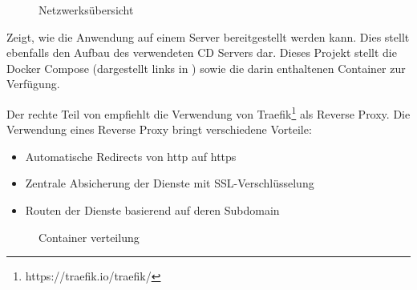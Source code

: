 \begin{figure}[h]
    \centering
    
    \caption{Netzwerksübersicht}\label{fig:Netzwerksuebersicht}
\end{figure}

\newpage
{} Zeigt, wie die Anwendung auf einem Server bereitgestellt werden kann.
Dies stellt ebenfalls den Aufbau des verwendeten \ac{CD} Servers dar.
Dieses Projekt stellt die Docker Compose (dargestellt links in )
sowie die darin enthaltenen Container zur Verfügung.

Der rechte Teil von  empfiehlt die Verwendung von Traefik\footnote{https://traefik.io/traefik/}
als Reverse Proxy.
Die Verwendung eines Reverse Proxy bringt verschiedene Vorteile:
\begin{itemize}
    \item Automatische Redirects von http auf https
    \item Zentrale Absicherung der Dienste mit \ac{SSL}-Verschlüsselung
    \item Routen der Dienste basierend auf deren Subdomain
\end{itemize}

\begin{figure}[h]
    \centering
    
    \caption{Container verteilung}\label{fig:Container-verteilung}
\end{figure}